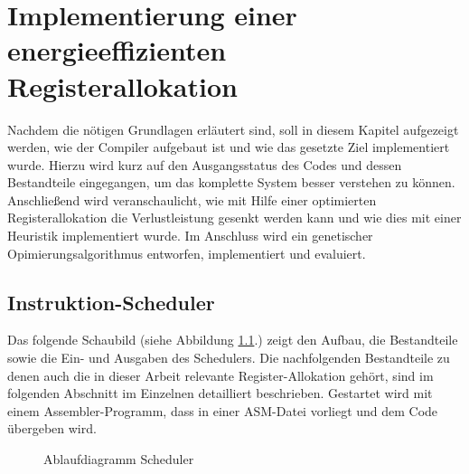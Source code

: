 \chapter{Implementierung einer energieeffizienten Registerallokation}
\label{chap:Implementierung}
Nachdem die nötigen Grundlagen erläutert sind, soll in diesem Kapitel aufgezeigt werden, wie der Compiler aufgebaut ist und wie das gesetzte Ziel implementiert wurde. Hierzu wird kurz auf den Ausgangsstatus des Codes und dessen Bestandteile eingegangen, um das komplette System besser verstehen zu können. Anschließend wird veranschaulicht, wie mit Hilfe einer optimierten Registerallokation die Verlustleistung gesenkt werden kann und wie dies mit einer Heuristik implementiert wurde. Im Anschluss wird ein genetischer Opimierungsalgorithmus entworfen, implementiert und evaluiert.
\newpage
\section{Instruktion-Scheduler}
 Das folgende Schaubild (siehe Abbildung \ref{fig:flow_compiler}.) zeigt den Aufbau, die Bestandteile sowie die Ein- und Ausgaben des Schedulers. Die nachfolgenden Bestandteile zu denen auch die in dieser Arbeit relevante Register-Allokation gehört, sind im folgenden Abschnitt im Einzelnen detailliert beschrieben.
 Gestartet wird mit einem Assembler-Programm, dass in einer ASM-Datei vorliegt und dem Code übergeben wird.
 
 
%			


	\begin{figure}[H] 
		\centering
		
		\caption{Ablaufdiagramm Scheduler}
		\label{fig:flow_compiler}
	\end{figure}

